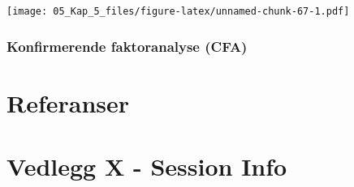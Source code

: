 \documentclass[
]{article}
\newenvironment{Shaded}{\begin{snugshade}}{\end{snugshade}}
\newcommand{\AttributeTok}[1]{\textcolor[rgb]{0.77,0.63,0.00}{#1}}
\newcommand{\DecValTok}[1]{\textcolor[rgb]{0.00,0.00,0.81}{#1}}
\newcommand{\FunctionTok}[1]{\textcolor[rgb]{0.00,0.00,0.00}{#1}}
\newcommand{\NormalTok}[1]{#1}
\newcommand{\SpecialCharTok}[1]{\textcolor[rgb]{0.00,0.00,0.00}{#1}}
\newcommand{\StringTok}[1]{\textcolor[rgb]{0.31,0.60,0.02}{#1}}
\newlength{\cslhangindent}
\newlength{\cslentryspacingunit} %
\newenvironment{CSLReferences}[2] %
 {%
  \setlength{\parindent}{0pt}
  \ifodd #1
  \let\oldpar\par
  \def\par{\hangindent=\cslhangindent\oldpar}
  \fi
  \setlength{\parskip}{#2\cslentryspacingunit}
 }%
 {}
\begin{document}
\begin{Shaded}
\end{Shaded}

\texttt{[image: 05\_Kap\_5\_files/figure-latex/unnamed-chunk-67-1.pdf]}

\hypertarget{konfirmerende-faktoranalyse-cfa}{%
\subsubsection{Konfirmerende faktoranalyse (CFA)}\label{konfirmerende-faktoranalyse-cfa}}

\hypertarget{referanser}{%
\section*{Referanser}\label{referanser}}

\hypertarget{refs}{}
\begin{CSLReferences}{0}{0}
\end{CSLReferences}

\hypertarget{vedlegg-x---session-info}{%
\section*{Vedlegg X - Session Info}\label{vedlegg-x---session-info}}
\end{document}
